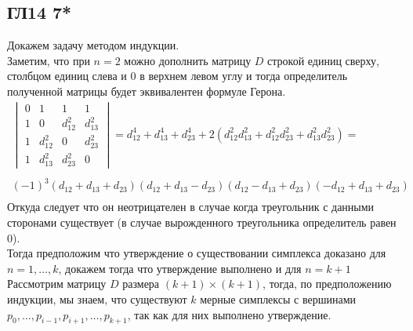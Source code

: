 \subsection*{ГЛ14 7*}
Докажем задачу методом индукции.\\
Заметим, что при $n=2$ можно дополнить матрицу $D$ строкой единиц сверху, столбцом единиц слева и $0$ в верхнем левом углу и тогда определитель полученной матрицы будет эквивалентен формуле Герона.
\begin{gather*}
	\begin{vmatrix}
		0 & 1 & 1 & 1\\
		1 & 0 & d_{12}^2 & d_{13}^2\\
		1 & d_{12}^2 & 0 & d_{23}^2\\
		1 & d_{13}^2 & d_{23}^2 & 0
	\end{vmatrix}
	= d_{12}^4 + d_{13}^4 + d_{23}^4 + 2(d_{12}^2 d_{13}^2 + d_{12}^2 d_{23}^2 + d_{13}^2 d_{23}^2) =\\
	\\
	(-1)^{3}(d_{12}+d_{13}+d_{23})(d_{12}+d_{13}-d_{23})(d_{12}-d_{13}+d_{23})(-d_{12}+d_{13}+d_{23})\\
\end{gather*}
Откуда следует что он неотрицателен в случае когда треугольник с данными сторонами существует (в случае вырожденного треугольника определитель равен 0).\\
Тогда предположим что утверждение о существовании симплекса доказано для $n = 1, \ldots, k$, докажем тогда что утверждение выполнено и для $n = k+1$\\
Рассмотрим матрицу $D$ размера $(k+1) \times (k+1)$, тогда, по предположению индукции, мы знаем, что существуют $k$ мерные симплексы с вершинами $p_0, \ldots, p_{i-1}, p_{i+1}, \ldots, p_{k+1}$, так как для них выполнено утверждение. 